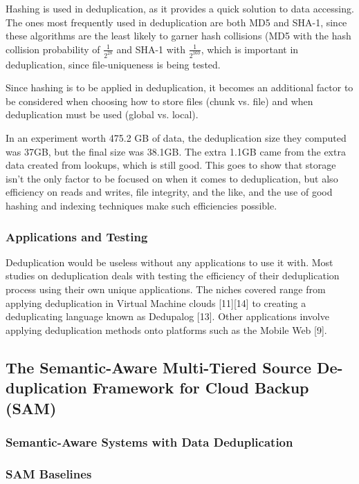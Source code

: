 \documentclass[journal]{IEEEtran}
\begin{document}
Hashing is used in deduplication, as it provides a quick solution to data accessing. The ones most frequently used in deduplication are both MD5 and SHA-1, since these algorithms are the least likely to garner hash collisions (MD5 with the hash collision probability of $\frac{1}{2^{28}}$ and SHA-1 with $\frac{1}{2^{160}}$, which is important in deduplication, since file-uniqueness is being tested.

Since hashing is to be applied in deduplication, it becomes an additional factor to be considered when choosing how to store files (chunk vs. file) and when deduplication must be used (global vs. local).

In an experiment worth 475.2 GB of data, the deduplication size they computed was 37GB, but the final size was 38.1GB. The extra 1.1GB came from the extra data created from lookups, which is still good. This goes to show that storage isn’t the only factor to be focused on when it comes to deduplication, but also efficiency on reads and writes, file integrity, and the like, and the use of good hashing and indexing techniques make such efficiencies possible.

\subsubsection{Applications and Testing}

Deduplication would be useless without any applications to use it with. Most studies on deduplication deals with testing the efficiency of their deduplication process using their own unique applications. The niches covered range from applying deduplication in Virtual Machine clouds [11][14] to creating a deduplicating language known as Dedupalog [13]. Other applications involve applying deduplication methods onto platforms such as the Mobile Web [9].

\subsection{The Semantic-Aware Multi-Tiered Source De-duplication Framework for Cloud Backup (SAM)}

\subsubsection{Semantic-Aware Systems with Data Deduplication}

\subsubsection{SAM Baselines}
\end{document}
